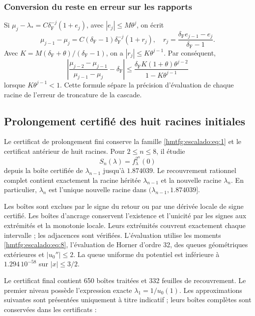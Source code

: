 \subsubsection{Conversion du reste en erreur sur les rapports}

Si \(\mu_j-\lambda_*=C\delta_{\mathrm F}^{-j}(1+e_j)\), avec \(|e_j|\le M\theta^j\), on écrit
\[
\mu_{j-1}-\mu_j=C(\delta_{\mathrm F}-1)\delta_{\mathrm F}^{-j}(1+r_j),
\quad
r_j=\frac{\delta_{\mathrm F} e_{j-1}-e_j}{\delta_{\mathrm F}-1}.
\]
Avec \(K=M(\delta_{\mathrm F}+\theta)/(\delta_{\mathrm F}-1)\), on a \(|r_j|\le K\theta^{j-1}\). Par conséquent,
\begin{equation}
\boxed{
\left|\frac{\mu_{j-2}-\mu_{j-1}}{\mu_{j-1}-\mu_j}-\delta_{\mathrm F}\right|
\le\frac{\delta_{\mathrm F} K(1+\theta)\theta^{j-2}}
{1-K\theta^{j-1}}}
\label{hmtfg:escalado:eq:25}
\end{equation}
lorsque \(K\theta^{j-1}<1\). Cette formule sépare la précision d’évaluation de chaque racine de l’erreur de troncature de la cascade.


\subsection{Prolongement certifié des huit racines initiales}
\label{hmtfg:escalado:9}

Le certificat de prolongement fini conserve la famille \eqref{hmtfg:escalado:eq:1} et le certificat antérieur de huit racines. Pour \(2\le n\le8\), il étudie
\[
S_n(\lambda)=f_\lambda^{2^n}(0)
\]
depuis la boîte certifiée de \(\lambda_{n-1}\) jusqu’à \(1.874039\). Le recouvrement rationnel complet contient exactement la racine héritée \(\lambda_{n-1}\) et la nouvelle racine \(\lambda_n\). En particulier, \(\lambda_n\) est l’unique nouvelle racine dans \((\lambda_{n-1},1.874039]\).

Les boîtes sont exclues par le signe du retour ou par une dérivée locale de signe certifié. Les boîtes d’ancrage conservent l’existence et l’unicité par les signes aux extrémités et la monotonie locale. Leurs extrémités couvrent exactement chaque intervalle ; les adjacences sont vérifiées. L’évaluation utilise les moments \eqref{hmtfg:escalado:eq:8}, l’évaluation de Horner d’ordre 32, des queues géométriques extérieures et \(|u_0''|\le2\). La queue uniforme du potentiel est inférieure à \(1.294\,10^{-58}\) sur \(|x|\le3/2\).

Le certificat final contient 650 boîtes traitées et 332 feuilles de recouvrement. Le premier niveau possède l’expression exacte \(\lambda_1=1/u_0(1)\). Les approximations suivantes sont présentées uniquement à titre indicatif ; leurs boîtes complètes sont conservées dans les certificats :

